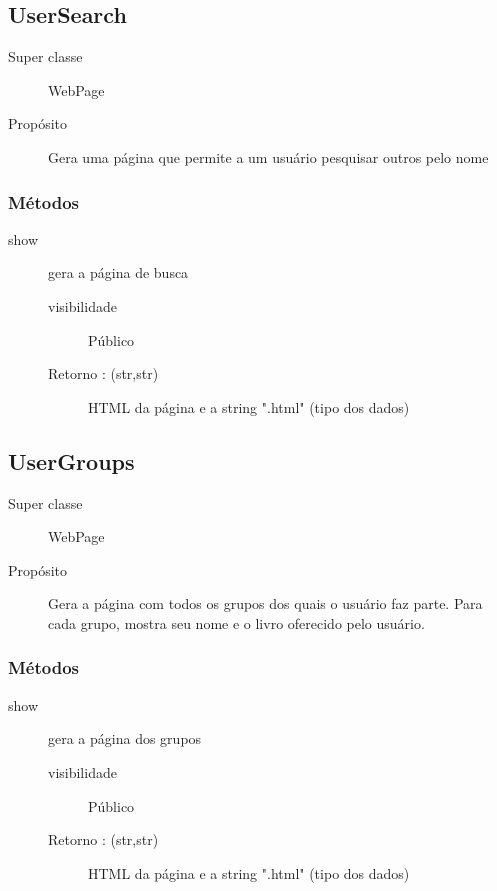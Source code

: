 \documentclass[a4paper]{article}
\begin{document}
	\subsection{UserSearch}
	
	\begin{description}
		\item [Super classe] WebPage
		\item [Propósito] Gera uma página que permite a um usuário pesquisar outros pelo nome
	\end{description}
	
	\subsubsection{Métodos}
		\begin{description} %
		 \item [show] gera a página de busca
			\begin{description} %
				\item [visibilidade] Público			 
				\item [Retorno : (str,str)] HTML da página e a string ".html" (tipo dos dados)
			\end{description} %
		\end{description} %
	
	\subsection{UserGroups}
	
	\begin{description}
		\item [Super classe] WebPage
		\item [Propósito] Gera a página com todos os grupos dos quais o usuário faz parte. Para cada grupo, mostra seu nome e o livro oferecido pelo usuário.
	\end{description}
	
	\subsubsection{Métodos}
		\begin{description} %
		 \item [show] gera a página dos grupos
			\begin{description} %
				\item [visibilidade] Público			 
				\item [Retorno : (str,str)] HTML da página e a string ".html" (tipo dos dados)
			\end{description} %
		\end{description} %
	
\end{document}
